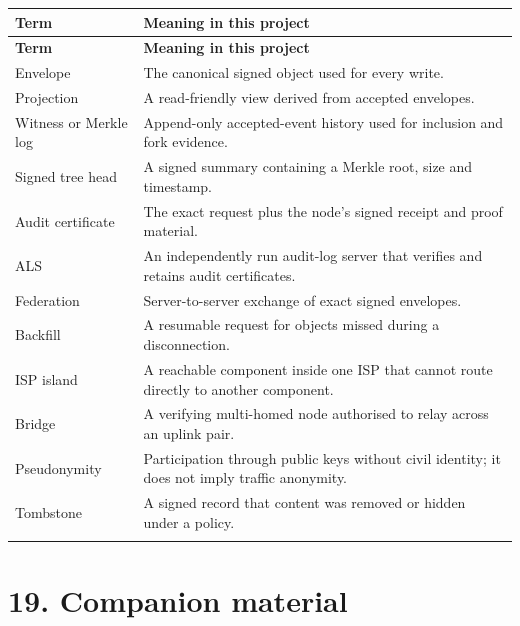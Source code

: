 \documentclass[12pt,a4paper]{article}
\begin{document}
\begin{small}
\begin{longtable}{@{}>{\raggedright\arraybackslash}p{}>{\raggedright\arraybackslash}p{}@{}}
\toprule
\textbf{Term} & \textbf{Meaning in this project} \\
\midrule
\endfirsthead
\toprule
\textbf{Term} & \textbf{Meaning in this project} \\
\midrule
\endhead
\bottomrule
\endfoot
Envelope & The canonical signed object used for every write. \\
\addlinespace[2pt]
Projection & A read-friendly view derived from accepted envelopes. \\
\addlinespace[2pt]
Witness or Merkle log & Append-only accepted-event history used for inclusion and fork evidence. \\
\addlinespace[2pt]
Signed tree head & A signed summary containing a Merkle root, size and timestamp. \\
\addlinespace[2pt]
Audit certificate & The exact request plus the node's signed receipt and proof material. \\
\addlinespace[2pt]
ALS & An independently run audit-log server that verifies and retains audit certificates. \\
\addlinespace[2pt]
Federation & Server-to-server exchange of exact signed envelopes. \\
\addlinespace[2pt]
Backfill & A resumable request for objects missed during a disconnection. \\
\addlinespace[2pt]
ISP island & A reachable component inside one ISP that cannot route directly to another component. \\
\addlinespace[2pt]
Bridge & A verifying multi-homed node authorised to relay across an uplink pair. \\
\addlinespace[2pt]
Pseudonymity & Participation through public keys without civil identity; it does not imply traffic anonymity. \\
\addlinespace[2pt]
Tombstone & A signed record that content was removed or hidden under a policy. \\
\addlinespace[2pt]
\end{longtable}
\end{small}
\clearpage
{}\section*{19. Companion material}
\end{document}
